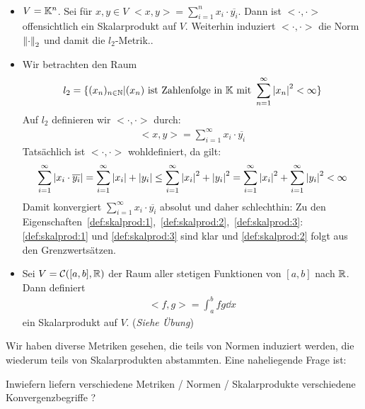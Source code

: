 \begin{Beispiel}{~
	\begin{itemize}
		\item $V = \mathbb{K}^n$. Sei für $x,y \in V$ $<x,y> = \sum_{i=1}^n x_i \cdot 
		\overline{y_i}$. Dann ist $<\cdot, \cdot>$ offensichtlich ein Skalarprodukt 
		auf $V$. Weiterhin induziert $<\cdot, \cdot>$ die Norm $\norm{\cdot}_2$ und 
		damit die $l_2$-Metrik..
		\item Wir betrachten den Raum
		\begin{align*}
			l_2 = \{ (x_n)_{n \in \mathbb{N}} \vert (x_n) \text{ ist Zahlenfolge in }
				\mathbb{K} \text{ mit } \sum_{n=1}^\infty \abs{x_n}^2 < \infty\}
		\end{align*}
		Auf $l_2$ definieren wir $<\cdot,\cdot>$ durch:
		\begin{align*}
			<x,y> = \sum_{i=1}^\infty x_i \cdot\overline{y_i}
		\end{align*}
		Tatsächlich ist $<\cdot,\cdot>$ wohldefiniert, da gilt: 
		\begin{align*}
			\sum_{i=1}^\infty \abs{x_i \cdot \overline{y_i}} = \sum_{i = 1}^\infty 
			\abs{x_i} + \abs{y_i} \leq \sum_{i = 1}^\infty \abs{x_i}^2 + \abs{y_i}^2 
			= \sum_{i = 1}^\infty \abs{x_i}^2 + \sum_{i=1}^{\infty} \abs{y_i}^2 < \infty
		\end{align*}
		Damit konvergiert $\sum_{i=1}^\infty x_i \cdot \overline{y_i}$ absolut und 
		daher schlechthin: Zu den Eigenschaften~\ref{def:skalprod:1},~\ref{def:skalprod:2},~\ref{def:skalprod:3}: \ref{def:skalprod:1} und \ref{def:skalprod:3} sind 
		klar und \ref{def:skalprod:2} folgt aus den Grenzwertsätzen.
		\item Sei $ V = \mathcal{C}([a,b], \mathbb{R})$ der Raum aller stetigen Funktionen von $[a,b]$ nach $\mathbb{R}$. Dann definiert 
		\begin{align*}
			<f,g> = \int_a^b f g \dd{x}
		\end{align*}
		ein Skalarprodukt auf $V$. (\textit{Siehe Übung})
	\end{itemize}
}\end{Beispiel}

Wir haben diverse Metriken gesehen, die teils von Normen induziert werden, die wiederum teils von Skalarprodukten abstammten. Eine naheliegende Frage ist:
\begin{center}
	Inwiefern liefern verschiedene Metriken / Normen / Skalarprodukte verschiedene Konvergenzbegriffe ?
\end{center}

